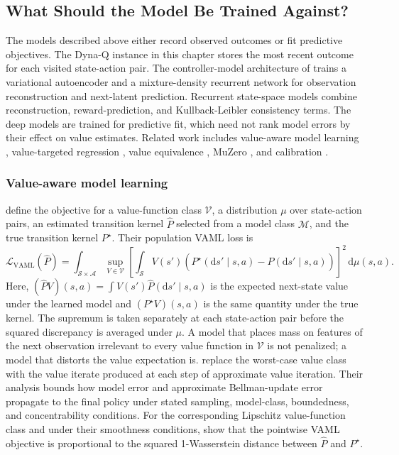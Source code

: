 \subsection{What Should the Model Be Trained Against?}
\label{section:fc_value_aware}

The models described above either record observed outcomes or fit predictive objectives. The Dyna-Q instance in this chapter stores the most recent outcome for each visited state-action pair. The controller-model architecture of \citet{HaSchmidhuber2018} trains a variational autoencoder and a mixture-density recurrent network for observation reconstruction and next-latent prediction. Recurrent state-space models combine reconstruction, reward-prediction, and Kullback-Leibler consistency terms. The deep models are trained for predictive fit, which need not rank model errors by their effect on value estimates. Related work includes value-aware model learning \citep{FarahmandVAML2017}, value-targeted regression \citep{AyoubVTR2020}, value equivalence \citep{GrimmVALEQ2020,GrimmPVE2021}, MuZero \citep{Schrittwieser2020MuZero}, and calibration \citep{VoelckerCalib2025}.

\subsubsection{Value-aware model learning}
\label{section:fc_value_aware_vaml}

\citet{FarahmandVAML2017} define the objective for a value-function class $\mathcal{V}$, a distribution $\mu$ over state-action pairs, an estimated transition kernel $\widehat P$ selected from a model class $\mathcal{M}$, and the true transition kernel $P^\star$. Their population VAML loss is
\[
\mathcal{L}_{\mathrm{VAML}}(\widehat P)
=
\int_{\mathcal{S}\times\mathcal{A}}
\sup_{V\in\mathcal{V}}
\left[
\int_{\mathcal{S}}
V(s')
\left(
P^\star(\mathrm{d}s' \mid s,a)
-
\widehat P(\mathrm{d}s' \mid s,a)
\right)
\right]^2
\,\mathrm{d}\mu(s,a).
\]
Here, $(\widehat P V)(s, a) = \int V(s') \widehat P(\mathrm{d} s' \mid s, a)$ is the expected next-state value under the learned model and $(P^\star V)(s, a)$ is the same quantity under the true kernel. The supremum is taken separately at each state-action pair before the squared discrepancy is averaged under $\mu$. A model that places mass on features of the next observation irrelevant to every value function in $\mathcal{V}$ is not penalized; a model that distorts the value expectation is. \citet{FarahmandIterVAML2018} replace the worst-case value class with the value iterate produced at each step of approximate value iteration. Their analysis bounds how model error and approximate Bellman-update error propagate to the final policy under stated sampling, model-class, boundedness, and concentrability conditions. For the corresponding Lipschitz value-function class and under their smoothness conditions, \citet{AsadiWasserstein2018} show that the pointwise VAML objective is proportional to the squared 1-Wasserstein distance between $\widehat P$ and $P^\star$.

